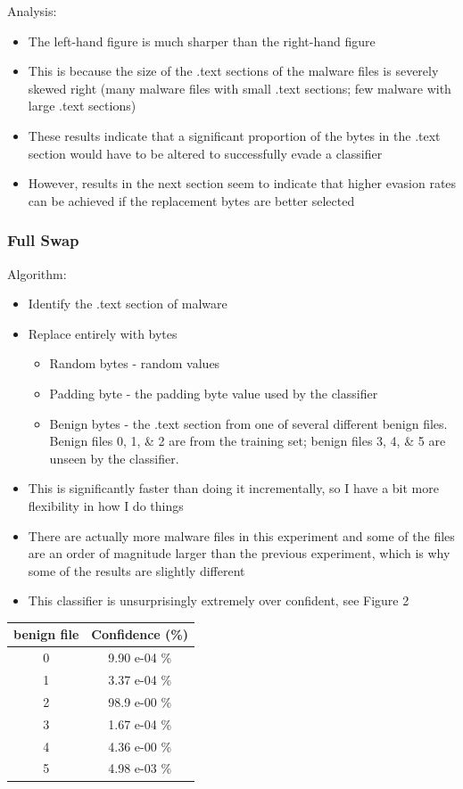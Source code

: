 \documentclass{article}
\begin{document}
\noindent Analysis:
\begin{itemize}
	\item The left-hand figure is much sharper than the right-hand figure
	\item This is because the size of the .text sections of the malware files is severely skewed right (many malware files with small .text sections; few malware with large .text sections)
	\item These results indicate that a significant proportion of the bytes in the .text section would have to be altered to successfully evade a classifier
	\item However, results in the next section seem to indicate that higher evasion rates can be achieved if the replacement bytes are better selected
\end{itemize}

\subsubsection*{Full Swap}

Algorithm:
\begin{itemize}
	\item Identify the .text section of malware
	\item Replace entirely with bytes
	\begin{itemize}
		\item Random bytes - random values
		\item Padding byte - the padding byte value used by the classifier
		\item Benign bytes - the .text section from one of several different benign files. Benign files 0, 1, \& 2 are from the training set; benign files 3, 4, \& 5 are unseen by the classifier.
	\end{itemize}
	\item This is significantly faster than doing it incrementally, so I have a bit more flexibility in how I do things
	\item There are actually more malware files in this experiment and some of the files are an order of magnitude larger than the previous experiment, which is why some of the results are slightly different
	\item This classifier is unsurprisingly extremely over confident, see Figure 2
\end{itemize}

\begin{center}
	\begin{tabular}{| c | c |}
		\hline
		benign file & Confidence (\%) \\
		\hline 
		0 & 9.90 e-04  \% \\   
		1 & 3.37 e-04 \% \\   
		2 & 98.9 e-00     \% \\ 
		3 & 1.67 e-04 \% \\ 
		4 & 4.36 e-00  \% \\
		5 & 4.98 e-03  \% \\
		\hline
	\end{tabular}
\end{center}
\end{document}
